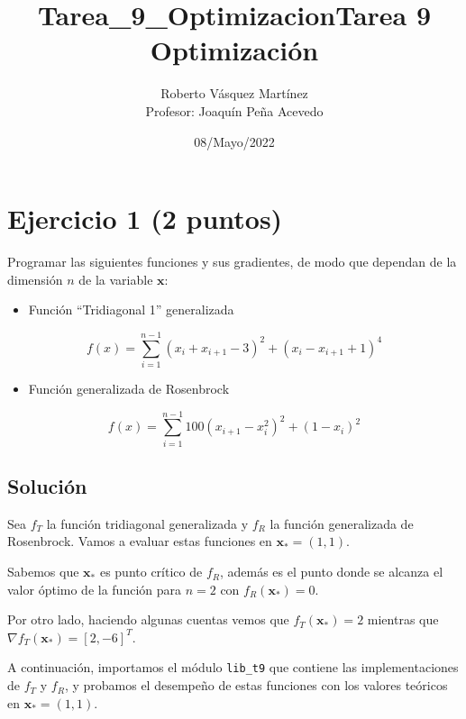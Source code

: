 \documentclass[11pt]{article}
\title{Tarea\_9\_Optimizacion}
\providecommand{\tightlist}{%
      \setlength{\itemsep}{0pt}\setlength{\parskip}{0pt}}
\begin{document}
    
\title{Tarea 9 Optimización}
\author{Roberto Vásquez Martínez \\ Profesor: Joaquín Peña Acevedo}
\date{08/Mayo/2022}
\maketitle 
    
    

    
    \hypertarget{ejercicio-1-2-puntos}{%
\section{Ejercicio 1 (2 puntos)}\label{ejercicio-1-2-puntos}}

Programar las siguientes funciones y sus gradientes, de modo que
dependan de la dimensión \(n\) de la variable \(\mathbf{x}\):

\begin{itemize}
\tightlist
\item
  Función ``Tridiagonal 1'' generalizada
\end{itemize}

\[  f(x) = \sum_{i=1}^{n-1} (x_i + x_{i+1} - 3)^2 + (x_i - x_{i+1} + 1)^4  \]

\begin{itemize}
\tightlist
\item
  Función generalizada de Rosenbrock
\end{itemize}

\[  f(x) = \sum_{i=1}^{n-1} 100(x_{i+1} - x_i^2)^2 + (1 - x_{i} )^2  \]

    \hypertarget{soluciuxf3n}{%
\subsection{Solución}\label{soluciuxf3n}}

Sea \(f_T\) la función tridiagonal generalizada y \(f_R\) la función
generalizada de Rosenbrock. Vamos a evaluar estas funciones en
\(\mathbf{x}_\ast=(1,1)\).

Sabemos que \(\mathbf{x}_\ast\) es punto crítico de \(f_R\), además es
el punto donde se alcanza el valor óptimo de la función para \(n=2\) con
\(f_R(\mathbf{x}_\ast)=0\).

Por otro lado, haciendo algunas cuentas vemos que
\(f_T(\mathbf{x}_\ast)=2\) mientras que
\(\nabla f_T(\mathbf{x}_\ast)=[2,-6]^T\).

A continuación, importamos el módulo \texttt{lib\_t9} que contiene las
implementaciones de \(f_T\) y \(f_R\), y probamos el desempeño de estas
funciones con los valores teóricos en \(\mathbf{x}_\ast=(1,1)\).
\end{document}
